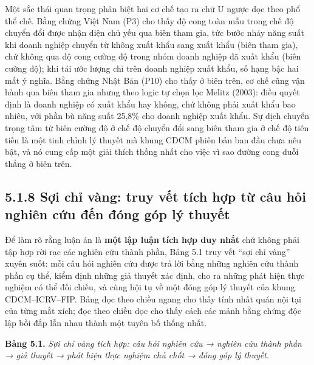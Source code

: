 \documentclass[
  a4paper,
  13pt]{extreport}
\begin{document}
Một sắc thái quan trọng phân biệt hai cơ chế tạo ra chữ U ngược dọc theo
phổ thể chế. Bằng chứng Việt Nam (P3) cho thấy độ cong toàn mẫu trong
chế độ chuyển đổi được nhận diện chủ yếu qua biên tham gia, tức bước
nhảy năng suất khi doanh nghiệp chuyển từ không xuất khẩu sang xuất khẩu
(biên tham gia), chứ không qua độ cong cường độ trong nhóm doanh nghiệp
đã xuất khẩu (biên cường độ); khi tái ước lượng chỉ trên doanh nghiệp
xuất khẩu, số hạng bậc hai mất ý nghĩa. Bằng chứng Nhật Bản (P10) cho
thấy ở biên trên, cơ chế cũng vận hành qua biên tham gia nhưng theo
logic tự chọn lọc Melitz (2003): điều quyết định là doanh nghiệp có xuất
khẩu hay không, chứ không phải xuất khẩu bao nhiêu, với phần bù năng
suất 25,8\% cho doanh nghiệp xuất khẩu. Sự dịch chuyển trọng tâm từ biên
cường độ ở chế độ chuyển đổi sang biên tham gia ở chế độ tiên tiến là
một tinh chỉnh lý thuyết mà khung CDCM phiên bản ban đầu chưa nêu bật,
và nó cung cấp một giải thích thống nhất cho việc vì sao đường cong duỗi
thẳng ở biên trên.

\hypertarget{sux1ee3i-chux1ec9-vuxe0ng-truy-vux1ebft-tuxedch-hux1ee3p-tux1eeb-cuxe2u-hux1ecfi-nghiuxean-cux1ee9u-ux111ux1ebfn-ux111uxf3ng-guxf3p-luxfd-thuyux1ebft}{%
\subsection{5.1.8 Sợi chỉ vàng: truy vết tích hợp từ câu hỏi nghiên cứu
đến đóng góp lý
thuyết}\label{sux1ee3i-chux1ec9-vuxe0ng-truy-vux1ebft-tuxedch-hux1ee3p-tux1eeb-cuxe2u-hux1ecfi-nghiuxean-cux1ee9u-ux111ux1ebfn-ux111uxf3ng-guxf3p-luxfd-thuyux1ebft}}

Để làm rõ rằng luận án là \textbf{một lập luận tích hợp duy nhất} chứ
không phải tập hợp rời rạc các nghiên cứu thành phần, Bảng 5.1 truy vết
``sợi chỉ vàng'' xuyên suốt: mỗi câu hỏi nghiên cứu được trả lời bằng
những nghiên cứu thành phần cụ thể, kiểm định những giả thuyết xác định,
cho ra những phát hiện thực nghiệm có thể đối chiếu, và cùng hội tụ về
một đóng góp lý thuyết của khung CDCM--ICRV--FIP. Bảng đọc theo chiều
ngang cho thấy tính nhất quán nội tại của từng mắt xích; đọc theo chiều
dọc cho thấy cách các mảnh bằng chứng độc lập bồi đắp lẫn nhau thành một
tuyên bố thống nhất.

\textbf{Bảng 5.1.} \emph{Sợi chỉ vàng tích hợp: câu hỏi nghiên cứu →
nghiên cứu thành phần → giả thuyết → phát hiện thực nghiệm chủ chốt →
đóng góp lý thuyết.}
\end{document}
